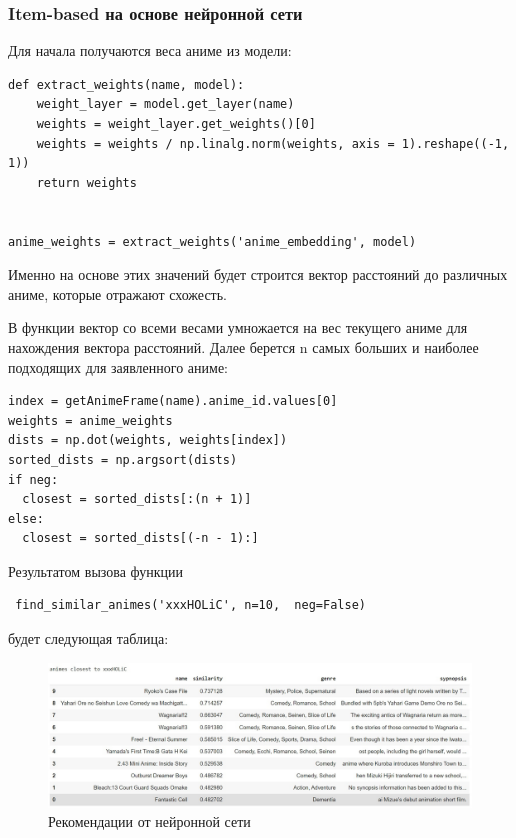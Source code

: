\documentclass[bachelor, och, diploma]{SCWorks}
\begin{document}
\subsubsection{Item-based на основе нейронной сети}
Для начала получаются веса аниме из модели:

\begin{verbatim}
def extract_weights(name, model):
    weight_layer = model.get_layer(name)
    weights = weight_layer.get_weights()[0]
    weights = weights / np.linalg.norm(weights, axis = 1).reshape((-1, 1))
    return weights


anime_weights = extract_weights('anime_embedding', model)
\end{verbatim}

Именно на основе этих значений будет строится вектор расстояний до различных аниме, которые отражают схожесть.

В функции вектор со всеми весами умножается на вес текущего аниме для нахождения вектора расстояний. Далее берется n самых больших и наиболее подходящих для заявленного аниме:

\begin{verbatim}
index = getAnimeFrame(name).anime_id.values[0]
weights = anime_weights
dists = np.dot(weights, weights[index])
sorted_dists = np.argsort(dists)          
if neg:
  closest = sorted_dists[:(n + 1)]
else:
  closest = sorted_dists[(-n - 1):]
\end{verbatim}

Результатом вызова функции

\begin{verbatim}
 find_similar_animes('xxxHOLiC', n=10,  neg=False)
\end{verbatim}

будет следующая таблица:
\begin{figure}[H]

	\centering
	
	\includegraphics[width=0.8\linewidth]{res1.png}
	
	\caption{Рекомендации от нейронной сети}
	
	\label{fig:r1}
	
\end{figure}
\end{document}
